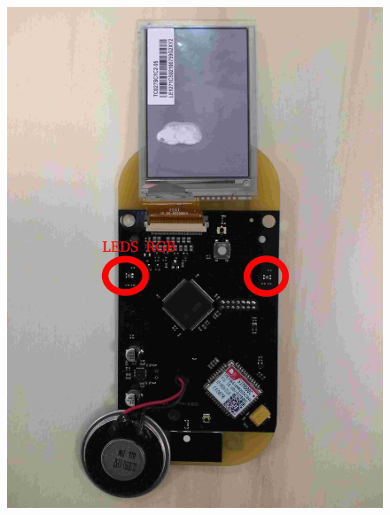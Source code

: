 \documentclass{article}
\begin{document}
\begin{figure}[H]
  \centering
  \begin{minipage}[b]{0.45\textwidth}
    \includegraphics[width=\textwidth]{base_dos_leds_rgb.jpg}
    

\end{minipage}
\end{figure}
\end{document}
